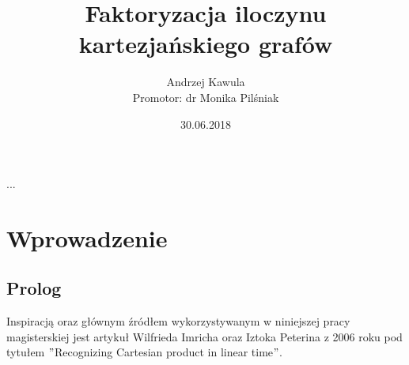 \documentclass[12pt,a4paper,titlepage]{article}
\title{Faktoryzacja iloczynu kartezjańskiego grafów }
\date{30.06.2018}
\author{Andrzej Kawula \\ Promotor: dr Monika Pilśniak}
\begin{document}
\maketitle
\newpage
\thispagestyle{empty}
\begin{flushright}
...
\end{flushright} 
\newpage
\tableofcontents
\newpage
\section{Wprowadzenie}
\subsection{Prolog}
Inspiracją oraz głównym źródłem wykorzystywanym w niniejszej pracy magisterskiej jest artykuł Wilfrieda Imricha oraz Iztoka Peterina z 2006 roku pod tytułem $"$Recognizing Cartesian product in linear time$"$. \\
\\
\end{document}
